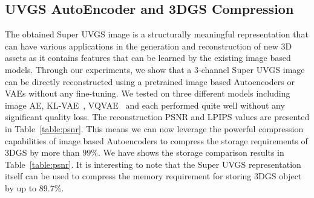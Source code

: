 \begin{table}[t]
\centering
\setlength{\tabcolsep}{0.75mm}
\renewcommand{\arraystretch}{1.2}
\caption{PSNR and LPIPS comparison for various reconstruction methods using UVGS and Super UVGS representations on Objaverse Cars and Full datasets. 
AE, VAE, VQVAE are pretrained image based models. $K$ is the number of UVGS layers used. 
We also report the compression \% (CP) compared to the fitted 3DGS.}
\label{table:psnr}
\vspace{-0.5cm}
\end{table}

\subsection{UVGS AutoEncoder and 3DGS Compression}\label{exp:uvgs_ae}
The obtained Super UVGS image is a structurally meaningful representation that can have various applications in the generation and reconstruction of new 3D assets as it contains features that can be learned by the existing image based models.
Through our experiments, we show that a 3-channel Super UVGS image can be directly reconstructed using a pretrained image based Autoencoders or VAEs without any fine-tuning. 
We tested on three different models including image AE, KL-VAE~\cite{KLvae2013}, VQVAE~\cite{vqvae2017} and each performed quite well without any significant quality loss. The reconstruction PSNR and LPIPS values are presented in Table~\ref{table:psnr}.
This means we can now leverage the powerful compression capabilities of image based Autoencoders to compress the storage requirements of 3DGS by more than $99\%$. We have shows the storage comparison results in Table~\ref{table:psnr}.
It is interesting to note that the Super UVGS representation itself can be used to compress the memory requirement for storing 3DGS object by up to $89.7\%$. 


